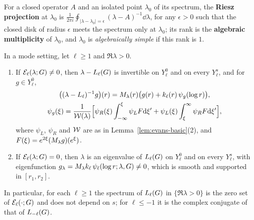 For a closed operator $A$ and an isolated point $\lambda_0$ of its spectrum, the
\textbf{Riesz projection} at $\lambda_0$ is
$\frac1{2\pi i}\oint_{|\lambda-\lambda_0|=\epsilon}(\lambda-A)^{-1}\dd\lambda$, for any
$\epsilon>0$ such that the closed disk of radius $\epsilon$ meets the spectrum only
at $\lambda_0$; its rank is the \textbf{algebraic multiplicity} of $\lambda_0$, and
$\lambda_0$ is \textit{algebraically simple} if this rank is $1$.

\begin{lemma}
\label{lem:resolvent}
In a mode setting, let $\ell\ge1$ and $\Re\lambda>0$.
\begin{enumerate}[label=\textup{(\arabic*)}]
\item If $\mathcal{E}_\ell(\lambda;G)\ne0$, then $\lambda-L_{\ell}(G)$ is invertible
  on $Y^0_\ell$ and on every $Y^s_\ell$, and for $g\in Y^0_\ell$,
  \[
  \begin{gathered}
  \big((\lambda-L_{\ell})^{-1}g\big)(r)=M_\lambda(r)\big(g(r)+k_\ell(r)\,\psi_g(\log r)\big),\\
  \psi_g(\xi)=\frac{1}{\mathcal{W}(\lambda)}\Big[\psi_R(\xi)\int_{-\infty}^{\xi}\psi_LF\dd\xi'+\psi_L(\xi)\int_{\xi}^{\infty}\psi_RF\dd\xi'\Big],
  \end{gathered}
  \]
  where $\psi_L$, $\psi_R$ and $\mathcal{W}$ are as in Lemma~\ref{lem:evans-basic}(2),
  and $F(\xi)=e^{2\xi}(M_\lambda g)(e^\xi)$.
\item If $\mathcal{E}_\ell(\lambda;G)=0$, then $\lambda$ is an eigenvalue of
  $L_{\ell}(G)$ on $Y^0_\ell$ and on every $Y^s_\ell$, with eigenfunction
  $g_\lambda=M_\lambda k_\ell\,\psi_\ell(\log r;\lambda,G)\ne0$, which is
  smooth and supported in $[r_1,r_2]$.
\end{enumerate}
In particular, for each $\ell\ge1$ the spectrum of $L_{\ell}(G)$ in
$\{\Re\lambda>0\}$ is the zero set of $\mathcal{E}_\ell(\cdot;G)$ and does not depend
on $s$; for $\ell\le-1$ it is the complex conjugate of that of $L_{-\ell}(G)$.
\end{lemma}
